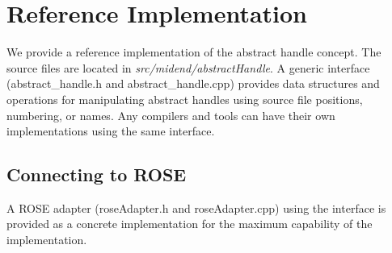 \section{Reference Implementation}
We provide a reference implementation of the abstract handle concept. 
The source files are located in \textit{src/midend/abstractHandle}.
A generic interface (abstract\_handle.h and abstract\_handle.cpp) provides
data structures and operations for manipulating abstract handles using source file positions, numbering, or names. 
Any compilers and tools can have their own implementations using the same interface.  
\subsection{Connecting to ROSE}
A ROSE adapter (roseAdapter.h and roseAdapter.cpp) using the interface is
provided as a concrete implementation for the maximum capability of the
implementation.

